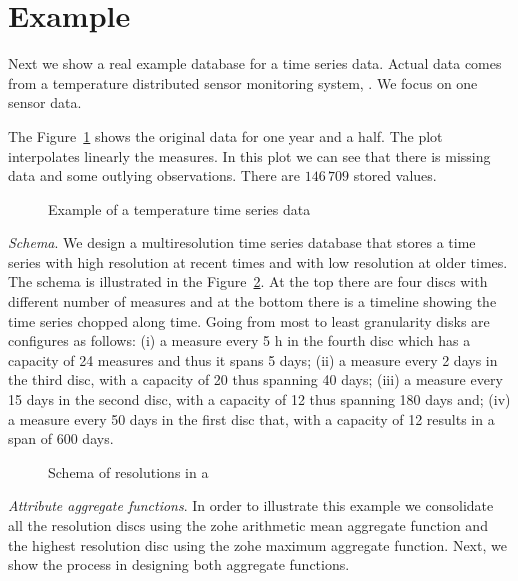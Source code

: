 \section{Example}
\label{sec:example}

Next we show a real example database for a time series data. Actual
data comes from a temperature distributed sensor monitoring system,
\cite{alippi10}. We focus on one sensor data.

The Figure~\ref{fig:exemple:original} shows the original data for one
year and a half. The plot interpolates linearly the measures. In this
plot we can see that there is missing data and some outlying
observations. There are $146\,709$ stored values.

\begin{figure}[tp]
  \centering
  
  \caption{Example of a temperature time series data}
  \label{fig:exemple:original}
\end{figure}

\emph{Schema}. We design a multiresolution time series database that
stores a time series with high resolution at recent times and with low
resolution at older times. The schema is illustrated in the
Figure~\ref{fig:exemple:window}. At the top there are four discs with
different number of measures and at the bottom there is a timeline
showing the time series chopped along time. Going from most to least
granularity disks are configures as follows: (i) a measure every 5 h
in the fourth disc which has a capacity of 24 measures and thus it
spans 5 days; (ii) a measure every 2 days in the third disc, with a
capacity of 20 thus spanning 40 days; (iii) a measure every 15 days in
the second disc, with a capacity of 12 thus spanning 180 days and;
(iv) a measure every 50 days in the first disc that, with a capacity
of 12 results in a span of 600 days.

\begin{figure}[tp]
  \centering
  \setlength{\unitlength}{1.3mm}
  
  \caption{Schema of resolutions in a }
  \label{fig:exemple:window}
\end{figure}

\emph{Attribute aggregate functions}.  In order to illustrate this
example we consolidate all the resolution discs using the zohe
arithmetic mean aggregate function and the highest resolution disc
using the zohe maximum aggregate function. Next, we show the process
in designing both aggregate functions.

